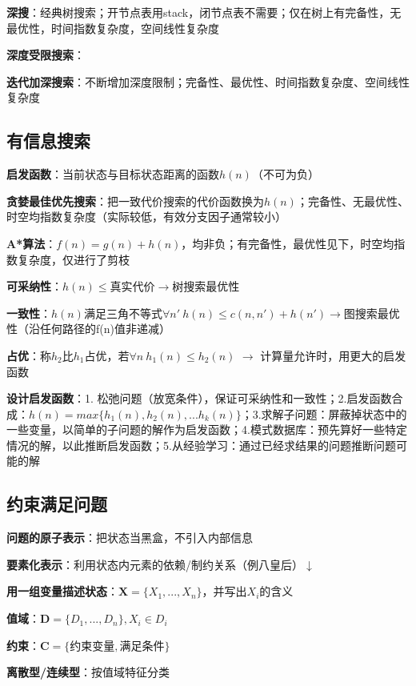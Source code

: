 	\textbf{深搜}：经典树搜索；开节点表用stack，闭节点表不需要；仅在树上有完备性，无最优性，时间指数复杂度，空间线性复杂度
	
	\textbf{深度受限搜索}：
	
	\textbf{迭代加深搜索}：不断增加深度限制；完备性、最优性、时间指数复杂度、空间线性复杂度
	
	\subsection*{有信息搜索}
	
	\textbf{启发函数}：当前状态与目标状态距离的函数$h(n)$（不可为负）
	
	\textbf{贪婪最佳优先搜索}：把一致代价搜索的代价函数换为$h(n)$；完备性、无最优性、时空均指数复杂度（实际较低，有效分支因子通常较小）
	
	\textbf{A*算法}：$f(n)=g(n)+h(n)$，均非负；有完备性，最优性见下，时空均指数复杂度，仅进行了剪枝
	
	\textbf{可采纳性}：$h(n)\leq$真实代价$\rightarrow$树搜索最优性
	
	\textbf{一致性}：$h(n)$满足三角不等式$\forall n'~h(n)\leq c(n,n')+h(n')\rightarrow$图搜索最优性（沿任何路径的f(n)值非递减）
	
	\textbf{占优}：称$h_2$比$h_1$占优，若$\forall n~h_1(n) \le h_2(n)$ $\rightarrow$ 计算量允许时，用更大的启发函数
	
	\textbf{设计启发函数}：1. 松弛问题（放宽条件），保证可采纳性和一致性；2.启发函数合成：$h(n)=max\{h_1(n), h_2(n), ... h_k(n)\}$；3.求解子问题：屏蔽掉状态中的一些变量，以简单的子问题的解作为启发函数；4.模式数据库：预先算好一些特定情况的解，以此推断启发函数；5.从经验学习：通过已经求结果的问题推断问题可能的解
	
	\subsection*{约束满足问题}
	
	\textbf{问题的原子表示}：把状态当黑盒，不引入内部信息
	
	\textbf{要素化表示}：利用状态内元素的依赖/制约关系（例八皇后）$\downarrow$
	
	\textbf{用一组变量描述状态}：$\mathbf{X}=\{X_1,...,X_n\}$，并写出$X_i$的含义
	
	\textbf{值域}：$\mathbf{D}=\{D_1,...,D_n\}, X_i \in D_i$
	
	\textbf{约束}：$\mathbf{C}=\{\text{约束变量}, \text{满足条件}\}$
	
	\textbf{离散型/连续型}：按值域特征分类
	
